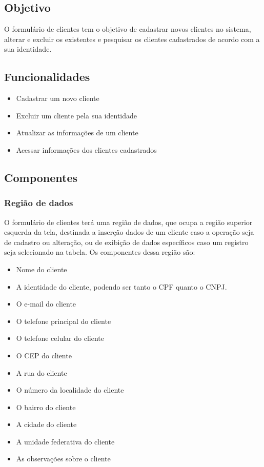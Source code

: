 \documentclass[
	article,			%
	12pt,				%
	oneside,			%
	a4paper,			%
	english,			%
	brazil,				%
	sumario=tradicional
	]{abntex2}
\begin{document}
		\subsection{Objetivo}
		O formulário de clientes tem o objetivo de cadastrar novos clientes no sistema, alterar e excluir os existentes e pesquisar os clientes cadastrados de acordo com a sua identidade.
		\subsection{Funcionalidades}
			\begin{itemize}
				\item Cadastrar um novo cliente
				\item Excluir um cliente pela sua identidade
				\item Atualizar as informações de um cliente
				\item Acessar informações dos clientes cadastrados
			\end{itemize}	
		\subsection{Componentes}
			\subsubsection{Região de dados}
			O formulário de clientes terá uma região de dados, que ocupa a região superior esquerda da tela, destinada a inserção dados de um cliente caso a operação seja de cadastro ou alteração, ou de exibição de dados específicos caso um registro seja selecionado na tabela.
			Os componentes dessa região são:
				\begin{itemize}\itemsep1.5pt
					\item Nome do cliente
					\item A identidade do cliente, podendo ser tanto o CPF quanto o CNPJ.
					\item O e-mail do cliente
					\item O telefone principal do cliente
					\item O telefone celular do cliente
					\item O CEP do cliente
					\item A rua do cliente
					\item O número da localidade do cliente
					\item O bairro do cliente
					\item A cidade do cliente
					\item A unidade federativa do cliente
					\item As observações sobre o cliente
				\end{itemize}
\end{document}
